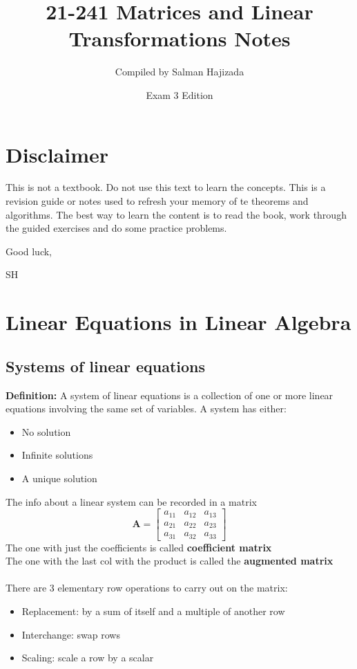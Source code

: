 \documentclass{report}
\title{21-241 Matrices and Linear Transformations Notes}
\date{Exam 3 Edition}
\author{Compiled by Salman Hajizada}
\begin{document}
\maketitle

\setcounter{chapter}{-1}
\chapter{Disclaimer}
This is not a textbook. Do not use this text to learn the concepts.
This is a revision guide or notes used to refresh your memory of te theorems
and algorithms. The best way to learn the content is to read the book, work through
the guided exercises and do some practice problems. 

Good luck,

SH
\chapter{Linear Equations in Linear Algebra}

\section{Systems of linear equations}
\textbf{Definition:} A system of linear equations is a collection of one or more linear equations involving the same set of variables.
A system has either:
\begin{itemize}
    \item No solution
    \item Infinite solutions
    \item A unique solution
\end{itemize}
The info about a linear system can be recorded in a matrix
\[
\mathbf{A} = \begin{bmatrix}
a_{11} & a_{12} & a_{13} \\
a_{21} & a_{22} & a_{23} \\
a_{31} & a_{32} & a_{33}
\end{bmatrix}
\]
The one with just the coefficients is called \textbf{coefficient matrix}
\\The one with the last col with the product is called the \textbf{augmented matrix}
\\\\There are 3 elementary row operations to carry out on the matrix:
\begin{itemize}
    \item Replacement: by a sum of itself and a multiple of another row
    \item Interchange: swap rows
    \item Scaling: scale a row by a scalar
\end{itemize}
\end{document}
